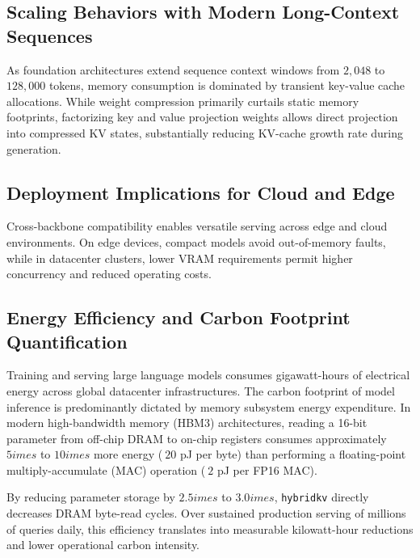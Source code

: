 \subsection{Scaling Behaviors with Modern Long-Context Sequences}
As foundation architectures extend sequence context windows from $2{,}048$ to $128{,}000$ tokens, memory consumption is dominated by transient key-value cache allocations. While weight compression primarily curtails static memory footprints, factorizing key and value projection weights allows direct projection into compressed KV states, substantially reducing KV-cache growth rate during generation.

\subsection{Deployment Implications for Cloud and Edge}
Cross-backbone compatibility enables versatile serving across edge and cloud environments. On edge devices, compact models avoid out-of-memory faults, while in datacenter clusters, lower VRAM requirements permit higher concurrency and reduced operating costs.

\subsection{Energy Efficiency and Carbon Footprint Quantification}
Training and serving large language models consumes gigawatt-hours of electrical energy across global datacenter infrastructures. The carbon footprint of model inference is predominantly dictated by memory subsystem energy expenditure. In modern high-bandwidth memory (HBM3) architectures, reading a 16-bit parameter from off-chip DRAM to on-chip registers consumes approximately $5	imes$ to $10	imes$ more energy ($~20$ pJ per byte) than performing a floating-point multiply-accumulate (MAC) operation ($~2$ pJ per FP16 MAC).

By reducing parameter storage by $2.5	imes$ to $3.0	imes$, \texttt{hybridkv} directly decreases DRAM byte-read cycles. Over sustained production serving of millions of queries daily, this efficiency translates into measurable kilowatt-hour reductions and lower operational carbon intensity.
